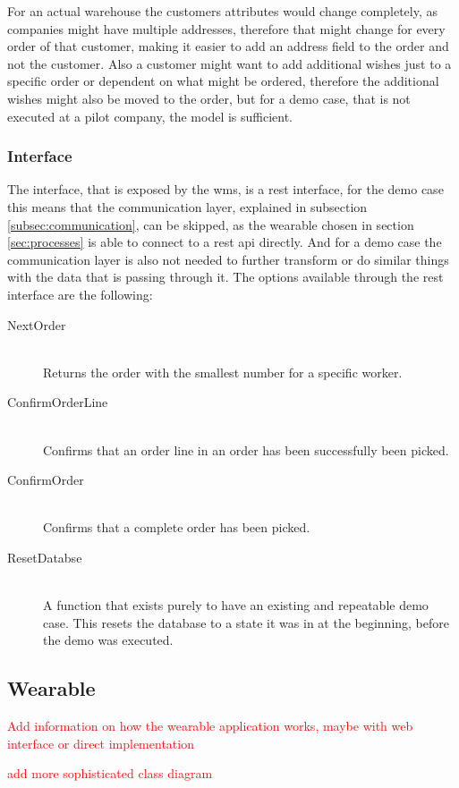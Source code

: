 For an actual warehouse the customers attributes would change completely, as companies might have multiple addresses, therefore that might change for every order of that customer, making it easier to add an address field to the order and not the customer.  Also a customer might want to add additional wishes just to a specific order or dependent on what might be ordered, therefore the additional wishes might also be moved to the order, but for a demo case, that is not executed at a pilot company, the model is sufficient.

\subsubsection{Interface}
The interface, that is exposed by the \gls{wms}, is a \gls{rest} interface, for the demo case this means that the communication layer, explained in subsection \ref{subsec:communication}, can be skipped, as the wearable chosen in section \ref{sec:processes} is able to connect to a \gls{rest} \gls{api} directly. And for a demo case the communication layer is also not needed to further transform or do similar things with the data that is passing through it. The options available through the \gls{rest} interface are the following:
\begin{description}
	\item[NextOrder] \hfill \\
	Returns the order with the smallest number for a specific worker.
	\item[ConfirmOrderLine] \hfill \\
	Confirms that an order line in an order has been successfully been picked.
	\item[ConfirmOrder] \hfill \\
	Confirms that a complete order has been picked.
	\item[ResetDatabse] \hfill \\
	A function that exists purely to have an existing and repeatable demo case. This resets the database to a state it was in at the beginning, before the demo was executed.
\end{description}

\subsection{Wearable}
\textcolor{red}{Add information on how the wearable application works, maybe with web interface or direct implementation}

\textcolor{red}{add more sophisticated class diagram}

